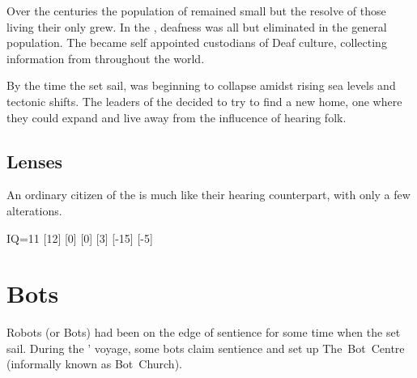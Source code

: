 \documentclass[a4paper,twocolumn]{memoir}
\begin{document}
Over the centuries the population of \deafisland remained small but the resolve
of those living their only grew. In the , deafness was all but
eliminated in the general population. The \deafies became self appointed
custodians of Deaf culture, collecting information from throughout the world.

By the time the \aventis set sail, \deafisland was beginning to collapse amidst rising
sea levels and tectonic shifts. The leaders of the \deafies decided to try to
find a new home, one where they could expand and live away from the influcence
of hearing folk.

\subsection{Lenses}
\label{sec:templates-deafies}
An ordinary citizen of the \deafies is much like their hearing counterpart, with
only a few alterations.

\begin{lens}{IQ=11}
  [12]
  [0]
  [0]
  [3]
  [-15]
  [-5]
\end{lens}


\section{Bots}
\label{sec:bots}

Robots (or Bots) had been on the edge of sentience for some time when the
\aventis set sail. During the \aventis' voyage, some bots claim sentience and
set up The~Bot~Centre (informally known as Bot~Church). 
\end{document}
